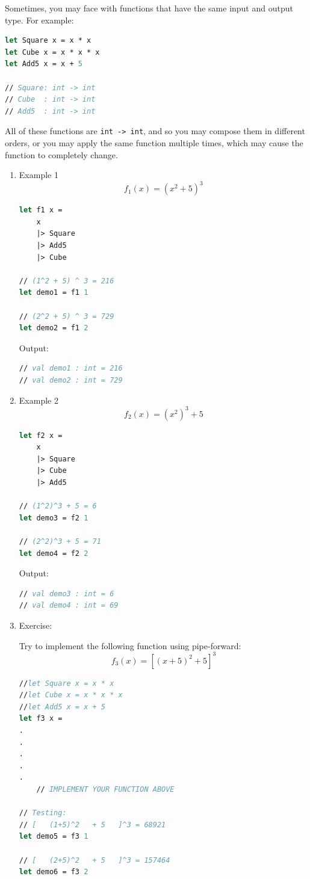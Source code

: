 \documentclass[12pt]{article}
\begin{document}
Sometimes, you may face with functions that have the same input and output type. For example:
\begin{lstlisting}[language=FSharp]
let Square x = x * x
let Cube x = x * x * x
let Add5 x = x + 5

// Square: int -> int
// Cube  : int -> int
// Add5  : int -> int
\end{lstlisting}
All of these functions are \texttt{int -> int}, and so you may compose them in different orders, or you may apply the same function multiple times, which may cause the function to completely change.
\begin{enumerate}
\item Example 1
\[
f_1(x) = \left(x^2 + 5\right)^3
\]
\begin{lstlisting}[language=FSharp]
let f1 x = 
    x
    |> Square
    |> Add5
    |> Cube
    
// (1^2 + 5) ^ 3 = 216
let demo1 = f1 1

// (2^2 + 5) ^ 3 = 729
let demo2 = f1 2
\end{lstlisting}
Output:
\begin{lstlisting}[language=FSharp]
// val demo1 : int = 216
// val demo2 : int = 729
\end{lstlisting}

\pagebreak
\item Example 2
\[
f_2(x) = \left(x^2\right)^3 + 5
\]
\begin{lstlisting}[language=FSharp]
let f2 x =
    x
    |> Square
    |> Cube
    |> Add5
    
// (1^2)^3 + 5 = 6
let demo3 = f2 1

// (2^2)^3 + 5 = 71
let demo4 = f2 2
\end{lstlisting}
Output:
\begin{lstlisting}[language=FSharp]
// val demo3 : int = 6
// val demo4 : int = 69
\end{lstlisting}
\item Exercise:

Try to implement the following function using pipe-forward:
\[
f_3(x) = \left[\left(x + 5\right)^2 + 5\right]^3
\]
\begin{lstlisting}[language=FSharp]
//let Square x = x * x
//let Cube x = x * x * x
//let Add5 x = x + 5
let f3 x =
.
.
.
.
.
	// IMPLEMENT YOUR FUNCTION ABOVE

// Testing:
// [   (1+5)^2   + 5   ]^3 = 68921
let demo5 = f3 1

// [   (2+5)^2   + 5   ]^3 = 157464
let demo6 = f3 2
\end{lstlisting}
\end{enumerate}
\end{document}
